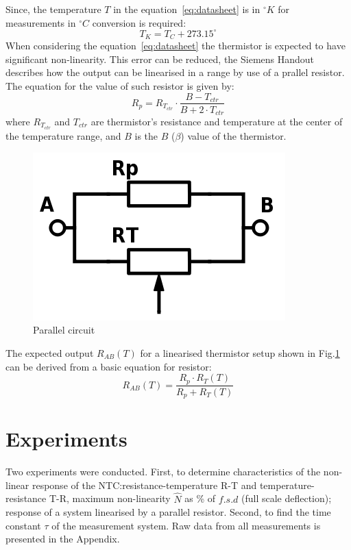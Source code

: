 \documentclass[a4,11pt]{article}
\begin{document}
Since, the temperature $T$ in the equation~\ref{eq:datasheet} is in $^\circ K$ for measurements in $^\circ C$ conversion is required:
\begin{equation}
  \label{eq:ctok}
T_K=T_C+273.15^\circ
\end{equation}
When considering the equation~\ref{eq:datasheet} the thermistor is expected to have significant non-linearity. This error can be reduced, the Siemens Handout describes how the output can be linearised in a range by use of a prallel resistor. The equation for the value of such resistor is given by:
\begin{equation}
  \label{eq:siemens}
R_p=R_{T_{ctr}}\cdot\frac{B-T_{ctr}}{B+2\cdot T_{ctr}}
\end{equation}
where $R_{T_{ctr}}$ and $T_{ctr}$ are thermistor's resistance and temperature at the center of the temperature range, and $B$ is the $B$ ($\beta$) value of the thermistor.
\begin{figure}[H]
  \label{fig:parallel}
  \centering
  \includegraphics[width=0.75\columnwidth]{parallel.png}
  \caption{
    Parallel circuit
  }
\end{figure}
The expected output $R_{AB}(T)$ for a linearised thermistor setup shown in Fig.\ref{fig:parallel} can be derived from a basic equation for resistor:
\begin{equation}
  \label{eq:Rab}
  R_{AB}(T)=\frac{R_p\cdot R_T(T)}{R_p+R_T(T)}
\end{equation}
\section{Experiments}
Two experiments were conducted. First, to determine characteristics of the non-linear response of the NTC:\@ resistance-temperature R-T and temperature-resistance T-R, maximum non-linearity $\hat N$ as \% of $f.s.d$ (full scale deflection); response of a system linearised by a parallel resistor. Second, to find the time constant $\tau$ of the measurement system. Raw data from all measurements is presented in the Appendix.
\end{document}
